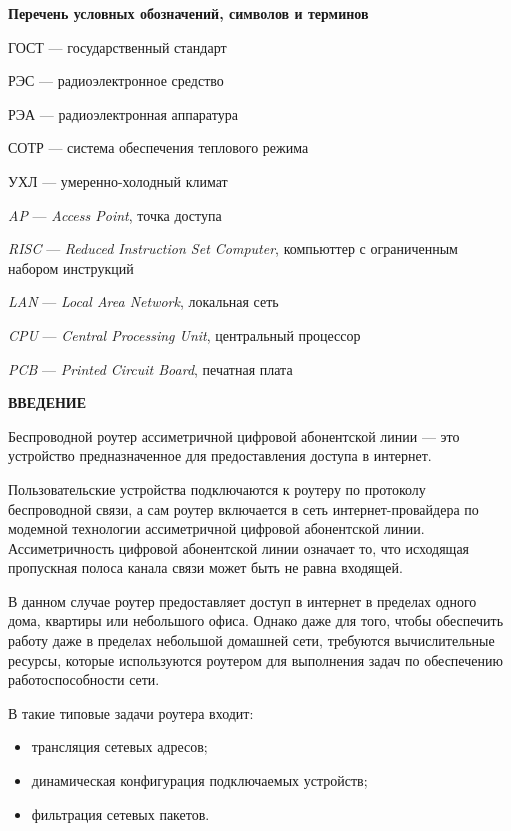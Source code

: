 \tableofcontents
\newpage
\begin{center}
\textbf{Перечень условных обозначений, символов и терминов}
\end{center}


ГОСТ — государственный стандарт

РЭС — радиоэлектронное средство

РЭА — радиоэлектронная аппаратура

СОТР — система обеспечения теплового режима

УХЛ — умеренно-холодный климат


\textit{AP} — \textit{Access Point}, точка доступа

\textit{RISC} — \textit{Reduced Instruction Set Computer}, компьюттер с  ограниченным набором инструкций

\textit{LAN} — \textit{Local Area Network}, локальная сеть

\textit{CPU} — \textit{Central Processing Unit}, центральный процессор

\textit{PCB} — \textit{Printed Circuit Board}, печатная плата

\newpage
\begin{center}
\textbf{ВВЕДЕНИЕ}
\end{center}

\par
Беспроводной роутер ассиметричной цифровой абонентской линии — это
устройство предназначенное для предоставления доступа в интернет.
\par
Пользовательские устройства подключаются к роутеру по протоколу
беспроводной связи, а сам роутер включается в сеть интернет-провайдера
по модемной технологии ассиметричной цифровой абонентской линии.
Ассиметричность цифровой абонентской линии означает то, что исходящая
пропускная полоса канала связи может быть не равна входящей.
\par
В данном случае роутер предоставляет доступ в интернет в пределах
одного дома, квартиры или небольшого офиса.
Однако даже для того, чтобы обеспечить работу даже в пределах
небольшой домашней сети, требуются вычислительные ресурсы,
которые используются роутером для выполнения задач
по обеспечению работоспособности сети.

В такие типовые задачи роутера входит:
\begin{itemize}[nosep]

\item трансляция сетевых адресов;
\item динамическая конфигурация подключаемых устройств;
\item фильтрация сетевых пакетов.
  
\end{itemize}

